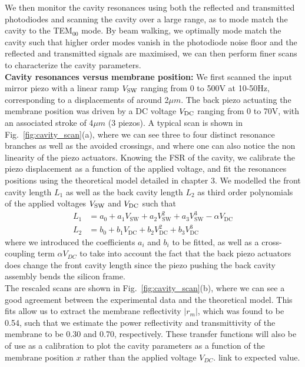 We then monitor the cavity resonances using both the reflected and transmitted photodiodes and scanning the cavity over a large range, as to mode match the cavity to the TEM$_{00}$ mode. By beam walking, we optimally mode match the cavity such that higher order modes vanish in the photodiode noise floor and the reflected and transmitted signals are maximised, we can then perform finer scans to characterize the cavity parameters. \\

\noindent \textbf{Cavity resonances versus membrane position: } We first scanned the input mirror piezo with a linear ramp $V_{\rm SW}$ ranging from 0 to 500V at 10-50Hz, corresponding to a displacements of around 2$\mu m$. The back piezo actuating the membrane position was driven by a DC voltage $V_{\rm DC}$ ranging from 0 to 70V, with an associated stroke of 4$\mu m$ (3 piezos). A typical scan is shown in Fig.~\ref{fig:cavity_scan}(a), where we can see three to four distinct resonance branches as well as the avoided crossings, and where one can also notice the non linearity of the piezo actuators. Knowing the FSR of the cavity, we calibrate the piezo displacement as a function of the applied voltage, and fit the resonances positions using the theoretical model detailed in chapter 3. We modelled the front cavity length $L_1$ as well as the back cavity length $L_2$ as third order polynomials of the applied voltages $V_{\rm SW}$ and $V_{\rm DC}$  such that
\begin{equation}
  \begin{split}
    L_1 &= a_0 + a_1 V_{\mathrm{SW}} + a_2 V_{\mathrm{SW}}^2 + a_3 V_{\mathrm{SW}}^3 - \alpha V_{\mathrm{DC}}\\
    L_2 &= b_0 + b_1 V_{\mathrm{DC}} + b_2 V_{\mathrm{DC}}^2 + b_3 V_{\mathrm{DC}}^3
  \end{split}
\end{equation} 
where we introduced the coefficients $a_i$ and $b_i$ to be fitted, as well as a cross-coupling term $\alpha V_{DC}$ to take into account the fact that the back piezo actuators does change the front cavity length since the piezo pushing the back cavity assembly bends the silicon frame. \\

The rescaled scans are shown in Fig.~\ref{fig:cavity_scan}(b), where we can see a good agreement between the experimental data and the theoretical model. This fits allow us to extract the membrane reflectivity $|r_m|$, which was found to be 0.54, such that we estimate the power reflectivity and transmittivity of the membrane to be  0.30 and 0.70, respectively. These transfer functions will also be of use as a calibration to plot the cavity parameters as a function of the membrane position $x$ rather than the applied voltage $V_{DC}$. \color{red} link to expected value\color{black}. \\

